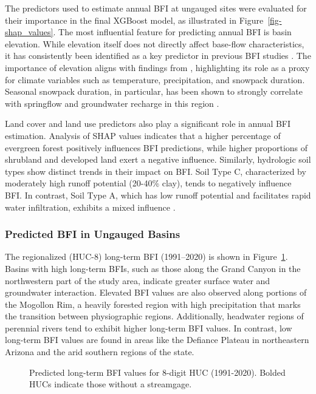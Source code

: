 \documentclass[
  authoryear,
  preprint,
  1p,
  onecolumn]{elsarticle}
\begin{document}
The predictors used to estimate annual BFI at ungauged sites were
evaluated for their importance in the final XGBoost model, as
illustrated in Figure~\ref{fig-shap_values}. The most influential
feature for predicting annual BFI is basin elevation. While elevation
itself does not directly affect base-flow characteristics, it has
consistently been identified as a key predictor in previous BFI studies
\citep{singh2018, beck2013}. The importance of elevation aligns with
findings from \citet{beck2013}, highlighting its role as a proxy for
climate variables such as temperature, precipitation, and snowpack
duration. Seasonal snowpack duration, in particular, has been shown to
strongly correlate with springflow and groundwater recharge in this
region \citep{donovan_karst_2022}.

Land cover and land use predictors also play a significant role in
annual BFI estimation. Analysis of SHAP values indicates that a higher
percentage of evergreen forest positively influences BFI predictions,
while higher proportions of shrubland and developed land exert a
negative influence. Similarly, hydrologic soil types show distinct
trends in their impact on BFI. Soil Type C, characterized by moderately
high runoff potential (20-40\% clay), tends to negatively influence BFI.
In contrast, Soil Type A, which has low runoff potential and facilitates
rapid water infiltration, exhibits a mixed influence \citep{nrcs2009}.

\subsubsection{Predicted BFI in Ungauged
Basins}\label{predicted-bfi-in-ungauged-basins}

The regionalized (HUC-8) long-term BFI (1991--2020) is shown in
Figure~\ref{fig-bfi-huc}. Basins with high long-term BFIs, such as those
along the Grand Canyon in the northwestern part of the study area,
indicate greater surface water and groundwater interaction. Elevated BFI
values are also observed along portions of the Mogollon Rim, a heavily
forested region with high precipitation that marks the transition
between physiographic regions. Additionally, headwater regions of
perennial rivers tend to exhibit higher long-term BFI values. In
contrast, low long-term BFI values are found in areas like the Defiance
Plateau in northeastern Arizona and the arid southern regions of the
state.

\begin{figure}


\caption{\label{fig-bfi-huc}Predicted long-term BFI values for 8-digit
HUC (1991-2020). Bolded HUCs indicate those without a streamgage.}

\end{figure}%
\end{document}
